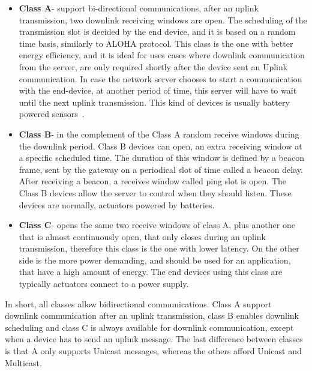 \begin{itemize}
	\item \textbf{Class A}- support bi-directional communications, after an uplink transmission, two downlink receiving windows are open. The scheduling of the transmission slot is decided by the end device, and it is based on a random time basis, similarly to ALOHA protocol.
	This class is the one with better energy efficiency, and it is ideal for uses cases where downlink communication from the server, are only required shortly after the device sent an Uplink communication.
	In case the network server chooses to start a communication with the end-device, at another period of time, this server will have to wait until the next uplink transmission. This kind of devices is usually battery powered sensors~\cite{Pacheco19}.

	\item\textbf{Class B}- in the complement of the Class A random receive windows during the downlink period. Class B devices can open, an extra receiving window at a specific scheduled time. The duration of this window is defined by a beacon frame, sent by the gateway on a periodical slot of time called a beacon delay. After receiving a beacon, a receives window called ping slot is open. The Class B devices allow the server to control when they should listen. These devices are normally, actuators powered by batteries.
	
	\item \textbf{Class C}- opens the same two receive windows of class A, plus another one that is almost continuously open, that only closes during an uplink transmission, therefore this class is the one with lower latency. On the other side is the more power demanding, and should be used for an application, that have a high amount of energy. The end devices using this class are typically actuators connect to a power supply.

\end{itemize}

In short, all classes allow bidirectional communications. Class A support downlink communication after an uplink transmission, class B enables downlink scheduling and class C is always available for downlink communication, except when a device has to send an uplink message. The last difference between classes is that A only supports Unicast messages, whereas the others afford Unicast and Multicast.


